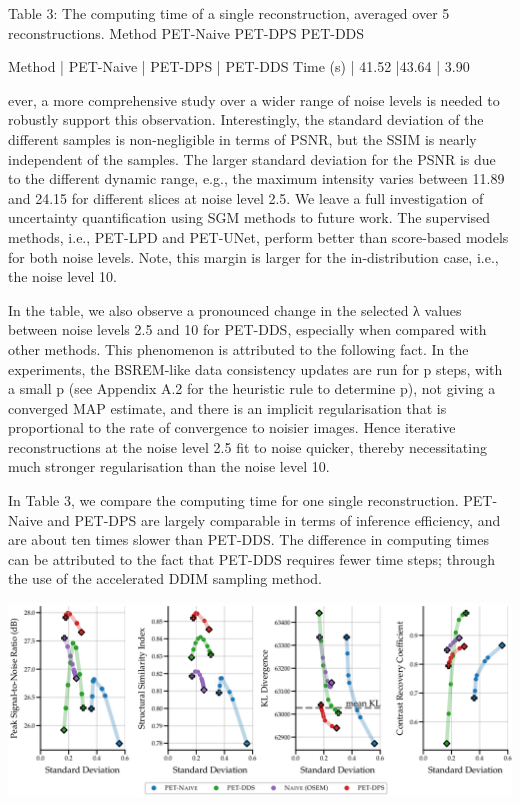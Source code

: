 \documentclass{article}
\begin{document}
Table 3: The computing time of a single reconstruction, averaged over 5 reconstructions. Method PET-Naive PET-DPS PET-DDS

Method | PET-Naive | PET-DPS | PET-DDS
Time (s) | 41.52    |43.64   | 3.90

ever, a more comprehensive study over a wider range of noise levels is needed to robustly support this observation. Interestingly, the standard deviation of the different samples is non-negligible in terms of PSNR, but the SSIM is nearly independent of the samples. The larger standard deviation for the PSNR is due to the different dynamic range, e.g., the maximum intensity varies between 11.89 and 24.15 for different slices at noise level 2.5. We leave a full investigation of uncertainty quantification using SGM methods to future work. The supervised methods, i.e., PET-LPD and PET-UNet, perform better than score-based models for both noise levels. Note, this margin is larger for the in-distribution case, i.e., the noise level 10.

In the table, we also observe a pronounced change in the selected λ values between noise levels 2.5 and 10 for PET-DDS, especially when compared with other methods. This phenomenon is attributed to the following fact. In the experiments, the BSREM-like data consistency updates are run for p steps, with a small p (see Appendix A.2 for the heuristic rule to determine p), not giving a converged MAP estimate, and there is an implicit regularisation that is proportional to the rate of convergence to noisier images. Hence iterative reconstructions at the noise level 2.5 fit to noise quicker, thereby necessitating much stronger regularisation than the noise level 10.

In Table 3, we compare the computing time for one single reconstruction. PET-Naive and PET-DPS are largely comparable in terms of inference efficiency, and are about ten times slower than PET-DDS. The difference in computing times can be attributed to the fact that PET-DDS requires fewer time steps; through the use of the accelerated DDIM sampling method.


\includegraphics{_page_15_Figure_1.png}
\end{document}
